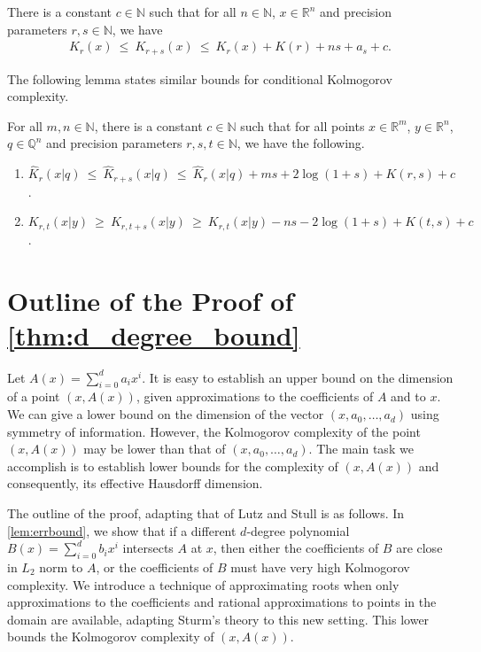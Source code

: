 \documentclass[a4paper,UKenglish,cleveref,autoref,thm-restate]{lipics-v2021}
\newcommand{\N}{\mathbb{N}}
\newcommand{\Q}{\mathbb{Q}}
\newcommand{\R}{\mathbb{R}}
\begin{document}
\begin{lemma}
\label{lem:precision_linear}
There is a constant $c\in\N$ such that for all $n\in\mathbb{N}$, $x\in\R^n$ and
precision parameters $r,s\in\N$, we have
\begin{align}
\label{ineq:precision_linear}
K_r(x)\ \le\ K_{r+s}(x) \ \le\ K_r(x)+K(r)+ns+a_s+c.
\end{align}
\end{lemma}
The following lemma states similar bounds for conditional Kolmogorov
complexity.

\begin{lemma}
  \label{lem:precision_var}
  For all $m,n\in\N$, there is a constant $c\in\N$ such that for all
  points $x\in\R^m$, $y\in\R^n$, $q\in\Q^n$ and precision parameters
  $r,s,t\in\N$, we have the following.
\begin{enumerate}
\item $\hat{K}_{r}(x|q)
  \ \le\ \hat{K}_{r+s}(x|q)
  \ \le\ \hat{K}_{r}(x|q)+ms+2\log(1+s)+K(r,s)+c$.
\item
  $K_{r,t}(x|y)
  \ \ge\ K_{r,t+s}(x|y)
  \ \ge\ K_{r,t}(x|y)-ns-2\log(1+s)+K(t,s)+c$.
\end{enumerate}
\end{lemma}

\section{Outline of the Proof of \cref{thm:d_degree_bound} }

Let $A(x)=\sum_{i=0}^d a_i x^i$. It is easy to establish an upper
bound on the dimension of a point $(x,A(x))$, given approximations to the coefficients of $A$ and to $x$. We can give a lower bound on the dimension of the vector $(x,a_0,\dots,a_d)$ using symmetry of information. However, the Kolmogorov complexity of the point $(x,A(x))$ may be lower than that of $(x,a_0,\dots,a_d)$. The main task we accomplish is to establish lower bounds for the complexity of $(x,A(x))$ and consequently, its effective Hausdorff dimension. 

The outline of the proof, adapting that of Lutz and Stull
\cite{Stull2020} is as follows. In \cref{lem:errbound}, we show that if a different $d$-degree polynomial $B(x)=\sum_{i=0}^d b_i x^i$ intersects $A$ at $x$, then either the coefficients of $B$ are close in $L_2$ norm to $A$, or the coefficients of $B$ must have very high Kolmogorov complexity. We introduce a technique of approximating roots when only approximations to the coefficients and rational approximations to points in the domain are available, adapting Sturm's theory to this new setting. This lower bounds the Kolmogorov complexity of $\left(x,A(x)\right)$. 
\end{document}
